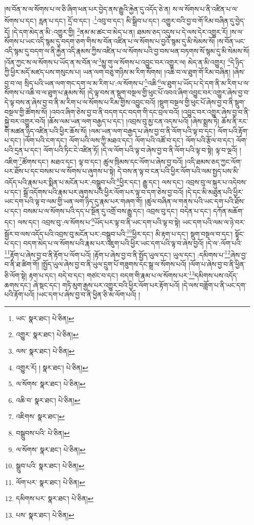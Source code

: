 །ས་བོན་ས་ལ་སོགས་པ་ལ་ཅི་ཞིག་ཕན་པར་བྱེད་ནས་རྒྱུའི་རྐྱེན་དུ་འདོད་ཅེ་ན། ས་ལ་སོགས་པ་ནི་འཛིན་པ་ལ་སོགས་པ་དང་། རླན་པ་དང་། དྲོ་བ་དང་། :\footnote{ཡང་  སྣར་ཐང་།  པེ་ཅིན། }འབུ་བ་དང་། མི་སྒྲིབ་པ་དང་། འགྱུར་བའི་བྱ་བ་གོ་རིམ་བཞིན་དུ་བྱེད་དོ། །དེ་དག་མེད་ན་མི་:འགྱུར་གྱི། \footnote{འགྱུར་  སྣར་ཐང་།  པེ་ཅིན། }ནམ་མ་ཚང་བ་མེད་པ་ན། ཐམས་ཅད་འདུས་པ་དེ་ལས་དེར་འགྱུར་རོ། །ས་ལ་སོགས་པ་ཡང་འདི་སྙམ་དུ་བདག་ཅག་གིས་ས་བོན་འཛིན་པ་ལ་སོགས་པ་བྱའོ་སྙམ་དུ་མི་སེམས་སོ། །ས་བོན་ཡང་འདི་སྙམ་དུ་བདག་ལ་ནི་རྐྱེན་འདི་རྣམས་ཀྱིས་འཛིན་པ་ལ་སོགས་པའི་བྱ་བས་ཕན་བཏགས་སོ་སྙམ་དུ་མི་སེམས་སོ། །འོན་ཀྱང་ས་ལ་སོགས་པ་ཡོད་ན་ས་བོན་ལ་\footnote{ལས་  སྣར་ཐང་།  པེ་ཅིན། }མྱུ་གུ་ལ་སོགས་པ་འབྱུང་བར་འགྱུར་ལ། མེད་ན་མི་འགྱུར། \footnote{འགྱུར་རོ། །   སྣར་ཐང་།  པེ་ཅིན། }དེ་ཉིད་ཀྱི་ཕྱིར་མདོ་མཛད་པས་གསུངས་པ། ཡན་ལག་བཅུ་གཉིས་མ་རིག་སོགས། །འཆི་བ་ལ་ཐུག་གོ་རིམ་བཞིན། །ཞེས་བྱ་བ་ལ། སྲིད་པའི་ཡན་ལག་གང་དག་ལ་མ་རིག་པ་:ལ་སོགས་པ་\footnote{ལ་སོགས་  སྣར་ཐང་།  པེ་ཅིན། }འཆི་\footnote{འཆི་བ་  སྣར་ཐང་།  པེ་ཅིན། }ལ་ཐུག་པ་ཡོད་པ་དེ་དག་ནི་མ་རིག་པ་ལ་སོགས་པ་འཆི་བ་ལ་ཐུག་པ་རྣམས་སོ། །དེ་ལྟ་བས་ན་སྡུག་བསྔལ་གྱི་ཕུང་པོ་འབའ་ཞིག་འབྱུང་བར་འགྱུར་ཞེས་བྱ་བ་དེ་ལྟ་བས་ན་ཞེས་བྱ་བ་ནི་མ་རིག་པ་ལ་སོགས་པ་རིམ་གྱིས་འབྱུང་བའོ། །སྡུག་བསྔལ་གྱི་ཕུང་པོ་ཞེས་བྱ་བ་ནི་སྡུག་བསྔལ་གྱི་ཚོགས་སོ། །འབའ་ཞིག་ཅེས་བྱ་བ་ནི་བདག་དང་བདག་གི་དང་བྲལ་བའོ། །འབྱུང་བར་འགྱུར་ཞེས་བྱ་བ་ནི་སྐྱེ་བར་འགྱུར་བའོ། །ཆོས་ལམ་ཡན་ལག་བརྒྱད་པ་དང་། །འབྲས་བུ་མྱ་ངན་འདས་པའོ། །ཞེས་སྨྲས་ཏེ། ཆོས་ནི་རང་གི་མཚན་ཉིད་འཛིན་པའི་ཕྱིར་ཆོས་སོ། །ལམ་ཡན་ལག་བརྒྱད་པ་ཞེས་བྱ་བ་ནི་ལོག་པའི་ལྟ་བ་དང་། ལོག་པའི་རྟོག་པ་དང་། །ལོག་པའི་ངག་དང་། ལོག་པའི་ལས་ཀྱི་མཐའ་དང་། ལོག་པའི་འཚོ་བ་དང་། ལོག་པའི་རྩོལ་བ་དང་། ལོག་པའི་དྲན་པ་དང་། ལོག་པའི་ཏིང་ངེ་འཛིན་ཏོ། །དེ་ལ་ལོག་པའི་ལྟ་བ་ཞེས་བྱ་བ་ནི་ལོག་པའི་ལྟ་བ་སྟེ། ལྟ་བ་ལྔའོ། །འཇིག་\footnote{འཇིགས་  སྣར་ཐང་། }ཚོགས་དང་། མཐའ་དང་། ལྟ་བ་དང་། ཚུལ་ཁྲིམས་དང་ལོག་པ་ཞེས་བྱ་བའོ། །འདི་ཐམས་ཅད་ཀྱང་ལོག་པར་ཐོས་པ་དང་བསམ་པ་ལ་སོགས་པ་ཞུགས་པ་སྟེ། དེ་བས་ན་ལྟ་བ་ངན་པའི་ཕྱིར་ལོག་པའི་ལམ་སྤྱད་པས་མི་འདོད་པའི་རྣམ་པར་སྨིན་པ་མངོན་པར་:བསྒྲུབ་པའི་\footnote{བསྒྲུབས་པའི་  པེ་ཅིན། }ཕྱིར་དང་། རྒྱུ་དང་། ལས་དང་། འབྲས་བུ་ལ་སྐུར་པ་འདེབས་པ་དང་། སྒྲོ་འདོགས་པའི་རྣམ་པར་ཞུགས་པའི་ཕྱིར་ལོག་པར་ལྟ་བ་དག་ཅེས་བྱ་བའོ། །དེ་དང་མི་མཐུན་པའི་ཕྱིར་ཡང་དག་པའི་ལྟ་བ་ལམ་གྱི་ཡན་ལག་ཉིད་དུ་རྣམ་པར་གཞག་གོ། །ཚུལ་བཞིན་ལ་གནས་པའི་ཡང་དག་པའི་ཐོས་པ་དང་། བསམ་པ་ལ་སོགས་པའི་དད་པ་སྔོན་དུ་འགྲོ་བས་རྒྱུ་དང་། འབྲས་བུ་དང་། བདེན་པ་དང་། དཀོན་མཆོག་དང་། ལས་དང་། འབྲས་བུ་:ལ་སོགས་པ་\footnote{ལ་སོགས་  སྣར་ཐང་།  པེ་ཅིན། }ཡོད་པར་ལྟ་བ་ནི་ཡང་དག་པའི་ལྟ་བ་སྟེ། ཡང་དག་པའི་ལམ་ལ་ཉེ་བར་སྦྱོར་བ་ལས་འདོད་པའི་འབྲས་བུ་མངོན་པར་:བསྒྲུབ་པའི་\footnote{སྒྲུབ་པའི་  སྣར་ཐང་།  པེ་ཅིན། }ཕྱིར་དང་། མི་རྟག་པ་དང་། སྡུག་བསྔལ་བ་དང་། སྟོང་པ་དང་། བདག་མེད་པ་ལ་སོགས་པའི་རྣམ་པར་འཇུག་པའི་ཕྱིར་ཡང་དག་པའི་ལྟ་བ་ཞེས་བྱའོ། །དེ་ལ་:ལོག་པའི་\footnote{ལོག་པར་  སྣར་ཐང་།  པེ་ཅིན། }རྟོག་པ་ཞེས་བྱ་བ་ནི་རྟོག་པ་ལོག་པའོ། །རྟོག་པ་ཞེས་བྱ་བ་ནི་སྤྱོད་ཡུལ་དང་། ཡུལ་དང་། :དམིགས་པ་\footnote{དམིགས་པར་  སྣར་ཐང་།  པེ་ཅིན། }ཞེས་བྱ་བ་ནི་ཐ་ཚིག་གོ། །སྤྱོད་ཡུལ་ཞེས་བྱ་བ་ནི་ཡུལ་དྲུག་པོ་གཟུགས་དང་སྒྲ་ལ་སོགས་པའོ། །ལོག་པ་ཞེས་བྱ་བ་ནི་ཕྱིན་ཅི་ལོག་སྟེ། རྟག་པ་དང་། བདེ་བ་དང་། གཙང་བ་དང་། བདག་གི་རྣམ་པ་ལ་སོགས་པར་\footnote{པས་  སྣར་ཐང་།  པེ་ཅིན། }དམིགས་པས་འདོད་ཆགས་དང་། ཞེ་སྡང་དང་། གཏི་མུག་རྒྱས་པར་འགྱུར་བའི་ཕྱིར་ལོག་པར་རྟོག་པའོ། །དེ་ལས་བཟློག་པ་ནི་ཡང་དག་པའི་རྟོག་པའོ། །ཡང་དག་པ་ཞེས་བྱ་བ་ནི་ཕྱིན་ཅི་མ་ལོག་པའོ། །
